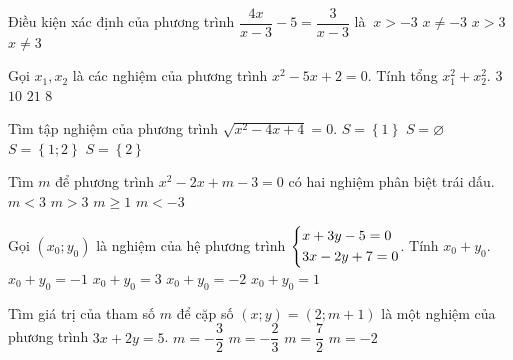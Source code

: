 \begin{ex}%
    Điều kiện xác định của phương trình $\dfrac{4x}{x-3}-5=\dfrac{3}{x-3}$ là
    \choice
    {$\ x>-3$}
    {$x\ne-3$}
    {$x>3$}
    {\True $x\ne 3$}
\end{ex}

\begin{ex}%
    Gọi $x_1, x_2$ là các nghiệm của phương trình $x^2-5x+2=0$. Tính tổng $x_1^2+x_2^2.$
    \choice
    {$3$}
    {$10$}
    {\True $21$}
    {$8$}
\end{ex}
\begin{ex}%
    Tìm tập nghiệm của phương trình $\sqrt{x^2-4x+4}=0$.
    \choice
    {$S=\left\{1\right\}$}
    {$S=\varnothing $}
    {$S=\left\{1; 2\right\}$}
    {\True $S=\left\{2\right\}$}
\end{ex}
\begin{ex}%
    Tìm $m$ để phương trình $x^2-2x+m-3=0$ có hai nghiệm phân biệt trái dấu.
    \choice
    {\True $m<3$}
    {$m>3$}
    {$m\ge 1$}
    {$m<-3$}
\end{ex}
\begin{ex}%
    Gọi $(x_0;y_0)$ là nghiệm của hệ phương trình $\left\{\begin{aligned}
        & x+3y-5=0 \\ 
        & 3x-2y+7=0\end{aligned}\right.$. Tính $x_0+y_0$.
    \choice
    {$x_0+y_0=-1$}
    {$x_0+y_0=3$}
    {$x_0+y_0=-2$}
    {\True $x_0+y_0=1$}
\end{ex}
\begin{ex}%
    Tìm giá trị của tham số $m$ để cặp số $(x;y)=(2;m+1)$ là một nghiệm của phương trình $3x+2y=5$.
    \choice
    {\True $m=-\dfrac{3}{2}$}
    {$m=-\dfrac{2}{3}$}
    {$m=\dfrac{7}{2}$}
    {$m=-2$}
\end{ex}
